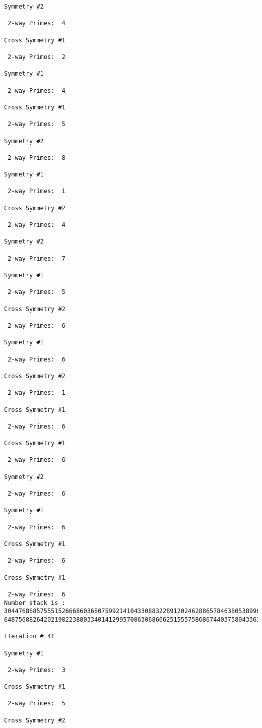 {{{{\begin{verbatim}
Symmetry #2

 2-way Primes: 	4

Cross Symmetry #1

 2-way Primes: 	2

Symmetry #1

 2-way Primes: 	4

Cross Symmetry #1

 2-way Primes: 	5

Symmetry #2

 2-way Primes: 	8

Symmetry #1

 2-way Primes: 	1

Cross Symmetry #2

 2-way Primes: 	4

Symmetry #2

 2-way Primes: 	7

Symmetry #1

 2-way Primes: 	5

Cross Symmetry #2

 2-way Primes: 	6

Symmetry #1

 2-way Primes: 	6

Cross Symmetry #2

 2-way Primes: 	1

Cross Symmetry #1

 2-way Primes: 	6

Cross Symmetry #1

 2-way Primes: 	6

Symmetry #2

 2-way Primes: 	6

Symmetry #1

 2-way Primes: 	6

Cross Symmetry #1

 2-way Primes: 	6

Cross Symmetry #1

 2-way Primes: 	6
Number stack is :
30447686857555152666860368075992141043308832289120246288657846380538996794608835958544046240163340857
64875688264202198223880334014129957086306866625155575868674403758043361042640445859538806497699835083

Iteration #	41

Symmetry #1

 2-way Primes: 	3

Cross Symmetry #1

 2-way Primes: 	5

Cross Symmetry #2


\end{verbatim}}}}}
